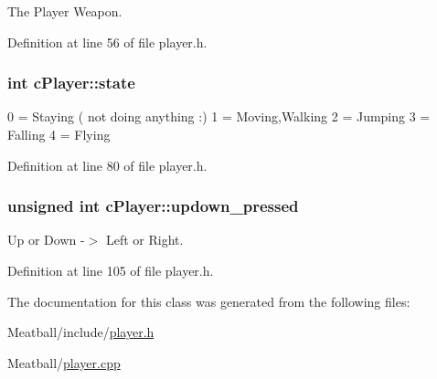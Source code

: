The Player Weapon. 



Definition at line 56 of file player.\-h.

\hypertarget{classc_player_a770b16e87c30e5ae205af92038fac0f9}{
\subsubsection[{state}]{\setlength{\rightskip}{0pt plus 5cm}int c\-Player\-::state}}\label{classc_player_a770b16e87c30e5ae205af92038fac0f9}
0 = Staying ( not doing anything \-:) 1 = Moving,Walking 2 = Jumping 3 = Falling 4 = Flying 

Definition at line 80 of file player.\-h.

\hypertarget{classc_player_ac2cb468d98391a6b9fbaa6db2e103a2d}{
\subsubsection[{updown\-\_\-pressed}]{\setlength{\rightskip}{0pt plus 5cm}unsigned int c\-Player\-::updown\-\_\-pressed}}\label{classc_player_ac2cb468d98391a6b9fbaa6db2e103a2d}


Up or Down -\/$>$ Left or Right. 



Definition at line 105 of file player.\-h.



The documentation for this class was generated from the following files\-:\begin{DoxyCompactItemize}
\item 
Meatball/include/\hyperlink{player_8h}{player.\-h}\item 
Meatball/\hyperlink{player_8cpp}{player.\-cpp}\end{DoxyCompactItemize}
